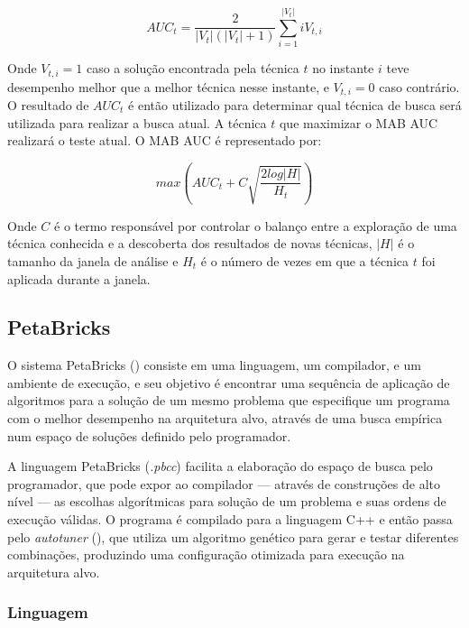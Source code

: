 \documentclass[a4paper, 11pt]{article}
\begin{document}
\begin{equation*}
    AUC_t = \frac{2} {|V_t|(|V_t|+1)} \sum_{i=1}^{|V_t|} iV_{t,i}
\end{equation*}

Onde $V_{t,i} = 1$ caso a solução encontrada pela técnica $t$ no instante
$i$ teve desempenho melhor que a melhor técnica nesse instante, e 
$V_{t,i} = 0$ caso contrário. O resultado de $AUC_t$ é então utilizado para
determinar qual técnica de busca será utilizada para realizar a busca atual.
A técnica $t$ que maximizar o MAB AUC realizará o teste atual. O MAB AUC é
representado por:

\begin{equation*}
    max \left( AUC_t + C\sqrt{\frac{2log|H|}{H_t}} \right)
\end{equation*}

Onde $C$ é o termo responsável por controlar o balanço entre a exploração de 
uma técnica conhecida e a descoberta dos resultados de novas técnicas, $|H|$ é
o tamanho da janela de análise e $H_t$ é o número de vezes em que a técnica $t$
foi aplicada durante a janela.

\subsection{PetaBricks} \label{sec:peta}

O sistema PetaBricks (\citet{ansel2009petabricks, ansel2014phd, 
ansel:xrds:2010, mitcsail-tr:2014})
consiste em uma linguagem, um compilador, e um ambiente de execução,
e seu objetivo é encontrar uma sequência de aplicação de algoritmos 
para a solução de um mesmo problema que especifique um programa com o melhor 
desempenho na arquitetura alvo, através de uma busca empírica num espaço
de soluções definido pelo programador.

A linguagem PetaBricks (\emph{.pbcc}) facilita a 
elaboração do espaço de busca pelo programador, que pode expor ao compilador 
--- através de construções de alto nível --- as escolhas algorítmicas 
para solução de um problema e suas ordens de execução válidas. O programa é 
compilado para a linguagem C++ e então passa pelo \emph{autotuner} 
(\citet{ansel2011efficient}), que utiliza um algoritmo genético para gerar e 
testar diferentes combinações, produzindo uma configuração otimizada para 
execução na arquitetura alvo.

\subsubsection{Linguagem}
\end{document}
